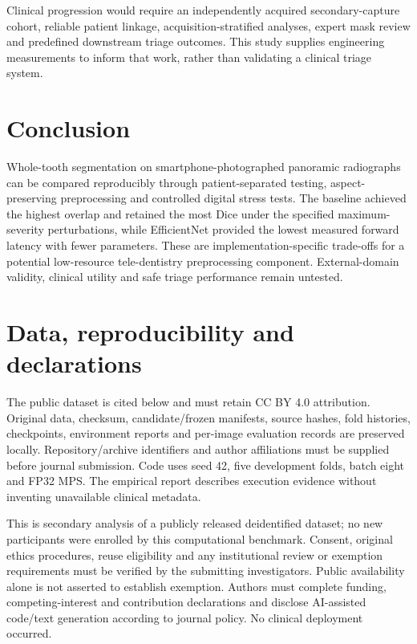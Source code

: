 \documentclass[11pt]{article}
\begin{document}
Clinical progression would require an independently acquired secondary-capture cohort, reliable patient linkage, acquisition-stratified analyses, expert mask review and predefined downstream triage outcomes. This study supplies engineering measurements to inform that work, rather than validating a clinical triage system.

\section{Conclusion}
Whole-tooth segmentation on smartphone-photographed panoramic radiographs can be compared reproducibly through patient-separated testing, aspect-preserving preprocessing and controlled digital stress tests. The baseline achieved the highest overlap and retained the most Dice under the specified maximum-severity perturbations, while EfficientNet provided the lowest measured forward latency with fewer parameters. These are implementation-specific trade-offs for a potential low-resource tele-dentistry preprocessing component. External-domain validity, clinical utility and safe triage performance remain untested.

\section*{Data, reproducibility and declarations}
The public dataset is cited below and must retain CC BY 4.0 attribution. Original data, checksum, candidate/frozen manifests, source hashes, fold histories, checkpoints, environment reports and per-image evaluation records are preserved locally. Repository/archive identifiers and author affiliations must be supplied before journal submission. Code uses seed 42, five development folds, batch eight and FP32 MPS. The empirical report describes execution evidence without inventing unavailable clinical metadata.

This is secondary analysis of a publicly released deidentified dataset; no new participants were enrolled by this computational benchmark. Consent, original ethics procedures, reuse eligibility and any institutional review or exemption requirements must be verified by the submitting investigators. Public availability alone is not asserted to establish exemption. Authors must complete funding, competing-interest and contribution declarations and disclose AI-assisted code/text generation according to journal policy. No clinical deployment occurred.
\end{document}
